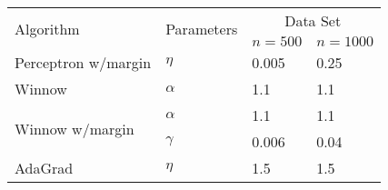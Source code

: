 
\usepackage{amsmath,amssymb,url,color,multirow,array}
\sloppy
\newcommand{\ignore}[1]{}

\oddsidemargin 0in
\evensidemargin 0in
\textwidth 6.5in
\topmargin -0.5in
\textheight 9.0in



\begin{center}
  \begin{table}[!hbp]
    \begin{tabular}{|p{4.3cm}<{\centering}|p{2.5cm}<{\centering}|p{4cm}<{\centering}|p{4cm}<{\centering}|}
      \hline
      \multirow{2}{*}{Algorithm} & \multirow{2}{*}{Parameters} & \multicolumn{2}{|c|}{Data Set} \\
      \cline{3-4}
 & & $n=500$& $n=1000$\\
 \hline
      Perceptron w/margin &          $\eta$          &0.005                   & 0.25                                 \\ \hline
      Winnow               &     $\alpha$           & 1.1                    &1.1                                   \\\hline %
      \multirow{2}{*}{Winnow w/margin}     & $\alpha$& 1.1                                    &  1.1                   \\
      \cline{2-4}
      & $\gamma$ & 0.006 & 0.04 \\ \hline %
      AdaGrad             & $\eta$&   1.5                                   &    1.5                               \\\hline %
    \end{tabular}
    \end{table}
  \end{center}
  
